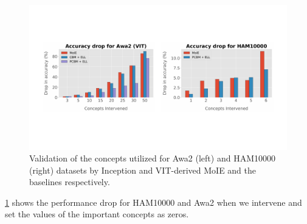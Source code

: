 \begin{figure}
\centering
\includegraphics[width=\columnwidth]
{figures/Supp/Acc_drop_ham_awa2.pdf}
\vskip -7pt
\caption{Validation of the concepts utilized for Awa2 (left) and HAM10000 (right) datasets by Inception and VIT-derived MoIE and the baselines respectively.}
\vskip -10pt
\label{fig:valid_concepts_other}
\end{figure}

\cref{fig:valid_concepts_other} shows the performance drop for HAM10000 and Awa2 when we intervene and set the values of the important concepts as zeros.